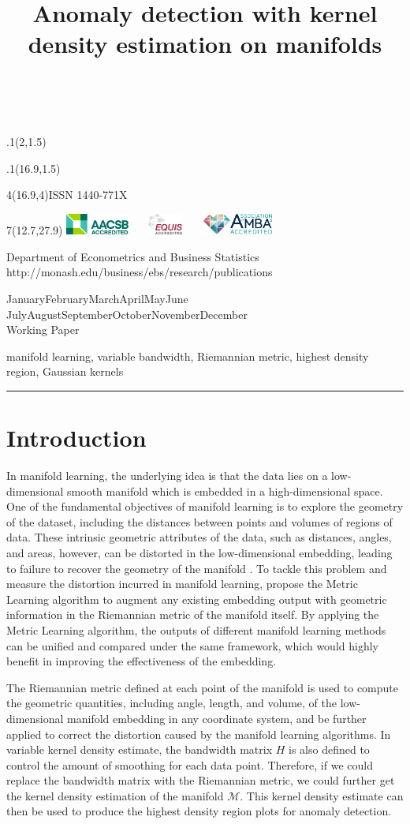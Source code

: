 \documentclass[11pt,a4paper,]{article}
\title{Anomaly detection with kernel density estimation on manifolds}
\date{\sf\Date~\Month~\Year}
\makeatletter
\def\Date{\number\day}
\def\Month{\ifcase\month\or
 January\or February\or March\or April\or May\or June\or
 July\or August\or September\or October\or November\or December\fi}
\def\Year{\number\year}
\def\showjel{{\large\textsf{\textbf{JEL classification:}}~\@jel}}
\def\cover{{\sffamily\setcounter{page}{0}
        \thispagestyle{empty}
        \placefig{2}{1.5}{width=5cm}{monash2}
        \placefig{16.9}{1.5}{width=2.1cm}{MBusSchool}
        \begin{textblock}{4}(16.9,4)ISSN 1440-771X\end{textblock}
        \begin{textblock}{7}(12.7,27.9)\hfill
        \includegraphics[height=0.7cm]{AACSB}~~~
        \includegraphics[height=0.7cm]{EQUIS}~~~
        \includegraphics[height=0.7cm]{AMBA}
        \end{textblock}
        \vspace*{2cm}
        \begin{center}\Large
        Department of Econometrics and Business Statistics\\[.5cm]
        \footnotesize http://monash.edu/business/ebs/research/publications
        \end{center}\vspace{2cm}
        \begin{center}
        \fbox{\parbox{14cm}{\begin{onehalfspace}\centering\Huge\vspace*{0.3cm}
                \textsf{\textbf{\expandafter{\@title}}}\vspace{1cm}\par
                \LARGE\@author\end{onehalfspace}
        }}
        \end{center}
        \vfill
                \begin{center}\Large
                \Month~\Year\\[1cm]
                Working Paper \@wp
        \end{center}\vspace*{2cm}}}
\def\pageone{{\sffamily\setstretch{1}%
        \thispagestyle{empty}%
        \vbox to \textheight{%
        \raggedright\baselineskip=1.2cm
     {\fontsize{24.88}{30}\sffamily\textbf{\expandafter{\@title}}}
        \vspace{2cm}\par
        \hspace{1cm}\parbox{14cm}{\sffamily\large\@addresses}\vspace{1cm}\vfill
        \hspace{1cm}{\large\Date~\Month~\Year}\\[1cm]
        \hspace{1cm}\showjel\vss}}}
\def\blindtitle{{\sffamily
     \thispagestyle{plain}\raggedright\baselineskip=1.2cm
     {\fontsize{24.88}{30}\sffamily\textbf{\expandafter{\@title}}}\vspace{1cm}\par
        }}
\def\titlepage{{\cover\newpage\pageone\newpage\blindtitle}}
\let\maketitle\titlepage
\newenvironment{keywords}{\par\vspace{0.5cm}\noindent{\sffamily\textbf{Keywords:}}}{\vspace{0.25cm}\par\hrule\vspace{0.5cm}\par}
\def\placefig#1#2#3#4{\begin{textblock}{.1}(#1,#2)\rlap{\texttt{[image: \#4]}}\end{textblock}}
\makeatother
\begin{document}
\maketitle
\begin{keywords}
manifold learning, variable bandwidth, Riemannian metric, highest density region, Gaussian kernels
\end{keywords}

\hypertarget{introduction}{%
\section{Introduction}\label{introduction}}

In manifold learning, the underlying idea is that the data lies on a low-dimensional smooth manifold which is embedded in a high-dimensional space. One of the fundamental objectives of manifold learning is to explore the geometry of the dataset, including the distances between points and volumes of regions of data. These intrinsic geometric attributes of the data, such as distances, angles, and areas, however, can be distorted in the low-dimensional embedding, leading to failure to recover the geometry of the manifold \autocite{Goldberg2008-co}. To tackle this problem and measure the distortion incurred in manifold learning, \textcite{Perrault-Joncas2013-pq} propose the Metric Learning algorithm to augment any existing embedding output with geometric information in the Riemannian metric of the manifold itself. By applying the Metric Learning algorithm, the outputs of different manifold learning methods can be unified and compared under the same framework, which would highly benefit in improving the effectiveness of the embedding.

The Riemannian metric defined at each point of the manifold is used to compute the geometric quantities, including angle, length, and volume, of the low-dimensional manifold embedding in any coordinate system, and be further applied to correct the distortion caused by the manifold learning algorithms.
In variable kernel density estimate, the bandwidth matrix \(H\) is also defined to control the amount of smoothing for each data point.
Therefore, if we could replace the bandwidth matrix with the Riemannian metric, we could further get the kernel density estimation of the manifold \(\mathcal{M}\). This kernel density estimate can then be used to produce the highest density region plots \autocite{Hyndman1996-lk} for anomaly detection.
\end{document}
